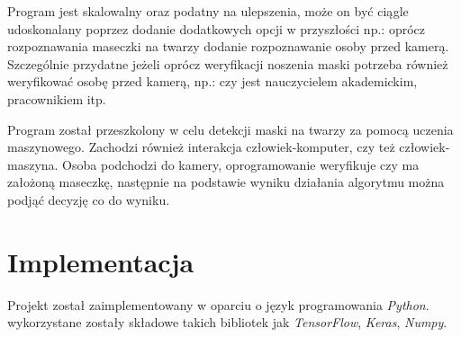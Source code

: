 \documentclass[12pt,a4paper]{article}
\begin{document}
Program jest skalowalny oraz podatny na ulepszenia, może on być ciągle udoskonalany poprzez dodanie dodatkowych opcji w przyszłości np.: oprócz rozpoznawania maseczki na twarzy dodanie rozpoznawanie osoby przed kamerą. Szczególnie przydatne jeżeli oprócz weryfikacji noszenia maski potrzeba również weryfikować osobę przed kamerą, np.: czy jest nauczycielem akademickim, pracownikiem itp.

Program został przeszkolony w celu detekcji maski na twarzy za pomocą uczenia maszynowego. Zachodzi również interakcja człowiek-komputer, czy też człowiek-maszyna. Osoba podchodzi do kamery, oprogramowanie weryfikuje czy ma założoną maseczkę, następnie na podstawie wyniku działania algorytmu można podjąć decyzję co do wyniku.
\newpage

\section{Implementacja}
Projekt został zaimplementowany w oparciu o język programowania \textit{Python}. wykorzystane zostały składowe takich bibliotek jak \textit{TensorFlow}, \textit{Keras}, \textit{Numpy}.
\end{document}
